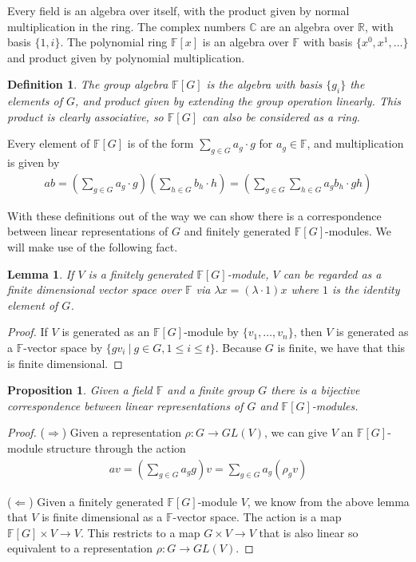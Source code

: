 \documentclass[10pt,a4paper]{article}
\newtheorem{definition}{Definition}
\newtheorem{proposition}{Proposition}
\newtheorem{lemma}{Lemma}
\begin{document}
Every field is an algebra over itself, with the product given by normal multiplication in the ring. The complex numbers $\mathbb{C}$ are an algebra over $\mathbb{R}$, with basis $\{1, i\}$. The polynomial ring $\mathbb{F}[x]$ is an algebra over $\mathbb{F}$ with basis $\{x^0, x^1, \dots\}$ and product given by polynomial multiplication.

\begin{definition}
The \emph{group algebra} $\mathbb{F}[G]$ is the algebra with basis $\{g_i\}$ the elements of $G$, and product given by extending the group operation linearly. This product is clearly associative, so $\mathbb{F}[G]$ can also be considered as a ring.
\end{definition}

Every element of $\mathbb{F}[G]$ is of the form $\sum_{g \in G} a_g \cdot g$ for $a_g \in \mathbb{F}$, and multiplication is given by 
\begin{align*}
ab = (\sum_{g \in G} a_g \cdot g)(\sum_{h \in G} b_h \cdot h) = (\sum_{g \in G}\sum_{h \in G} a_g b_h \cdot gh)
\end{align*}

With these definitions out of the way we can show there is a correspondence between linear representations of $G$ and finitely generated $\mathbb{F}[G]$-modules. We will make use of the following fact.

\begin{lemma}
If $V$ is a finitely generated $\mathbb{F}[G]$-module, $V$ can be regarded as a finite dimensional vector space over $\mathbb{F}$ via $\lambda x = (\lambda \cdot 1)x$ where $1$ is the identity element of $G$.
\end{lemma}

\begin{proof}
If $V$ is generated as an $\mathbb{F}[G]$-module by $\{v_1, \dots, v_n\}$, then $V$ is generated as a $\mathbb{F}$-vector space by $\{g v_i \:|\: g \in G, 1 \leq i \leq t\}$. Because $G$ is finite, we have that this is finite dimensional.
\end{proof}

\begin{proposition}
Given a field $\mathbb{F}$ and a finite group $G$ there is a bijective correspondence between linear representations of $G$ and $\mathbb{F}[G]$-modules.
\end{proposition}

\begin{proof}
($\Rightarrow$) Given a representation $\rho : G \to GL(V)$, we can give $V$ an $\mathbb{F}[G]$-module structure through the action
\begin{align*}
	av = \left(\sum_{g \in G} a_g g\right)v = \sum_{g \in G} a_g (\rho_g v)
\end{align*}

($\Leftarrow$) Given a finitely generated $\mathbb{F}[G]$-module $V$, we know from the above lemma that $V$ is finite dimensional as a $\mathbb{F}$-vector space. The action is a map $\mathbb{F}[G] \times V \to V$. This restricts to a map $G \times V \to V$ that is also linear so equivalent to a representation $\rho : G \to GL(V)$.
\end{proof}
\end{document}
